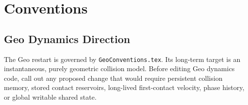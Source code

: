 \section{Conventions}

\subsection{Geo Dynamics Direction}

The Geo restart is governed by \texttt{GeoConventions.tex}.  Its long-term
target is an instantaneous, purely geometric collision model.  Before editing
Geo dynamics code, call out any proposed change that would require persistent
collision memory, stored contact reservoirs, long-lived first-contact velocity,
phase history, or global writable shared state.

